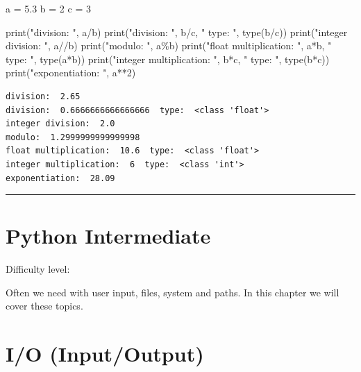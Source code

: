 \documentclass[
  letterpaper,
  DIV=11,
  numbers=noendperiod]{scrreprt}
\newenvironment{Shaded}{\begin{snugshade}}{\end{snugshade}}
\newcommand{\BuiltInTok}[1]{\textcolor[rgb]{0.00,0.23,0.31}{#1}}
\newcommand{\DecValTok}[1]{\textcolor[rgb]{0.68,0.00,0.00}{#1}}
\newcommand{\FloatTok}[1]{\textcolor[rgb]{0.68,0.00,0.00}{#1}}
\newcommand{\NormalTok}[1]{\textcolor[rgb]{0.00,0.23,0.31}{#1}}
\newcommand{\OperatorTok}[1]{\textcolor[rgb]{0.37,0.37,0.37}{#1}}
\newcommand{\StringTok}[1]{\textcolor[rgb]{0.13,0.47,0.30}{#1}}
\begin{document}
\begin{Shaded}
\begin{Highlighting}[]
\NormalTok{a }\OperatorTok{=} \FloatTok{5.3}
\NormalTok{b }\OperatorTok{=} \DecValTok{2}
\NormalTok{c }\OperatorTok{=} \DecValTok{3}

\BuiltInTok{print}\NormalTok{(}\StringTok{"division: "}\NormalTok{, a}\OperatorTok{/}\NormalTok{b)}
\BuiltInTok{print}\NormalTok{(}\StringTok{"division: "}\NormalTok{, b}\OperatorTok{/}\NormalTok{c, }\StringTok{" type: "}\NormalTok{, }\BuiltInTok{type}\NormalTok{(b}\OperatorTok{/}\NormalTok{c))}
\BuiltInTok{print}\NormalTok{(}\StringTok{"integer division: "}\NormalTok{, a}\OperatorTok{//}\NormalTok{b)}
\BuiltInTok{print}\NormalTok{(}\StringTok{"modulo: "}\NormalTok{, a}\OperatorTok{\%}\NormalTok{b)}
\BuiltInTok{print}\NormalTok{(}\StringTok{"float multiplication: "}\NormalTok{, a}\OperatorTok{*}\NormalTok{b, }\StringTok{" type: "}\NormalTok{, }\BuiltInTok{type}\NormalTok{(a}\OperatorTok{*}\NormalTok{b))}
\BuiltInTok{print}\NormalTok{(}\StringTok{"integer multiplication: "}\NormalTok{, b}\OperatorTok{*}\NormalTok{c, }\StringTok{" type: "}\NormalTok{, }\BuiltInTok{type}\NormalTok{(b}\OperatorTok{*}\NormalTok{c))}
\BuiltInTok{print}\NormalTok{(}\StringTok{"exponentiation: "}\NormalTok{, a}\OperatorTok{**}\DecValTok{2}\NormalTok{)}
\end{Highlighting}
\end{Shaded}

\begin{verbatim}
division:  2.65
division:  0.6666666666666666  type:  <class 'float'>
integer division:  2.0
modulo:  1.2999999999999998
float multiplication:  10.6  type:  <class 'float'>
integer multiplication:  6  type:  <class 'int'>
exponentiation:  28.09
\end{verbatim}

\begin{center}\rule{0.5\linewidth}{0.5pt}\end{center}

\chapter{Python Intermediate}\label{python-intermediate}

Difficulty level: { }

Often we need with user input, files, system and paths. In this chapter
we will cover these topics.

\chapter*{I/O (Input/Output)}\label{io-inputoutput}
\end{document}
